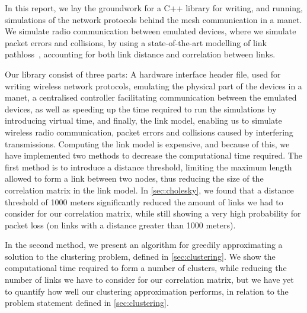 In this report, we lay the groundwork for a C++ library for writing, and running, simulations of the network protocols behind the mesh communication in a \gls{manet}. We simulate radio communication between emulated devices, where we simulate packet errors and collisions, by using a state-of-the-art modelling of link \gls{pathloss}~\cite{paper:linkmodel}, accounting for both link distance and correlation between links. \medbreak

Our library consist of three parts: A hardware interface header file, used for writing wireless network protocols, emulating the physical part of the devices in a \gls{manet}, a centralised controller facilitating communication between the emulated devices, as well as speeding up the time required to run the simulations by introducing virtual time, and finally, the link model, enabling us to simulate wireless radio communication, packet errors and collisions caused by interfering transmissions. Computing the link model is expensive, and because of this, we have implemented two methods to decrease the computational time required. \smallbreak
The first method is to introduce a distance threshold, limiting the maximum length allowed to form a link between two nodes, thus reducing the size of the correlation matrix in the link model. In \autoref{sec:cholesky}, we found that a distance threshold of 1000 meters significantly reduced the amount of links we had to consider for our correlation matrix, while still showing a very high probability for packet loss (on links with a distance greater than 1000 meters). \smallbreak

In the second method, we present an algorithm for greedily approximating a solution to the clustering problem, defined in \autoref{sec:clustering}. We show the computational time required to form a number of clusters, while reducing the number of links we have to consider for our correlation matrix, but we have yet to quantify how well our clustering approximation performs, in relation to the problem statement defined in \autoref{sec:clustering}. \smallbreak




